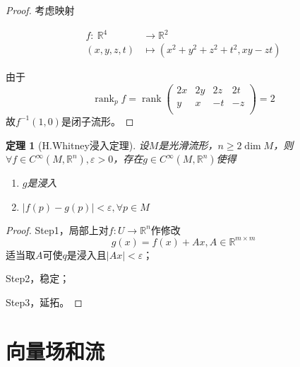 \documentclass[winfonts,UTF8,c5size,a4paper,fancyhdr,hyperref,titlepage,nocap]{ctexart}
\newtheorem{thm}{定理}
\theoremstyle{definition}
\theoremstyle{remark}
\numberwithin{equation}{subsection}
\newcommand{\Real}{\mathbb{R}}
\newcommand{\rank}{\operatorname{rank}}
\newcommand{\mapdes}[5]
  {
    \begin{align*}
      #1\colon\  #2 & \longrightarrow  #3 \\
            #4 & \mapsto  #5
    \end{align*}
  }
\begin{document}
\begin{proof}
考虑映射
\mapdes{f}{\Real^4}{\Real^2}{(x,y,z,t)}{(x^2+y^2+z^2+t^2,xy-zt)}
由于
\begin{equation*}
\rank_pf=\rank\left(
                 \begin{array}{cccc}
                   2x & 2y & 2z & 2t \\
                   y & x & -t & -z \\
                 \end{array}
               \right)
               =2
\end{equation*}
故$f^{-1}(1,0)$是闭子流形。
\end{proof}
\begin{thm}[H.Whitney浸入定理]
设$M$是光滑流形，$n\geqslant 2\dim M$，则$\forall f\in C^{\infty}(M,\Real^n), \varepsilon>0$，存在$g\in C^{\infty}(M,\Real^n)$使得
    \begin{enumerate}[1)]
    \setlength{\itemindent}{2ex}
    \item $g$是浸入
    \item $|f(p)-g(p)|<\varepsilon,\forall p\in M$
  \end{enumerate}
\end{thm}
\begin{proof}
Step1，局部上对$f\colon U\to\Real^n$作修改
\begin{equation*}
g(x)=f(x)+Ax, A\in\Real^{m\times m}
\end{equation*}
适当取$A$可使$q$是浸入且$|Ax|<\varepsilon$；

Step2，稳定；

Step3，延拓。
\end{proof}

\section{向量场和流}
\end{document}
